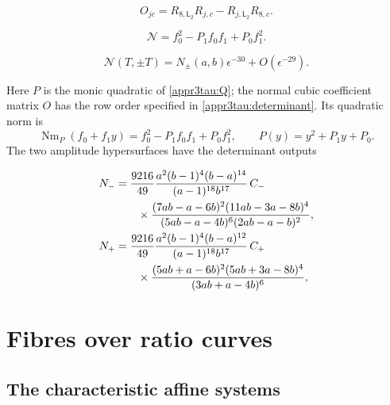 \begin{equation}\label{supp:appr3tau:determinant}
 O_{jc}=R_{8,\mathsf L_2}R_{j,c}
             -R_{j,\mathsf L_2}R_{8,c}.
\end{equation}

\begin{equation}\label{supp:appr3tau:norm}
 \mathcal N=f_0^2-P_1f_0f_1+P_0f_1^2.
\end{equation}

\begin{equation}\label{supp:appr3tau:laurent}
 \mathcal N(T,\pm T)
   =N_\pm(a,b)\epsilon^{-30}+O(\epsilon^{-29}).
\end{equation}

Here $P$ is the monic quadratic of
\eqref{appr3tau:Q}; the normal cubic coefficient matrix $O$
has the row order specified in \eqref{appr3tau:determinant}.
Its quadratic norm is
\[
 \operatorname{Nm}_{P}(f_0+f_1y)
       =f_0^2-P_1f_0f_1+P_0f_1^2,
 \qquad P(y)=y^2+P_1y+P_0.
\]
The two amplitude hypersurfaces have the determinant outputs

\begin{align}
 N_-&=\frac{9216}{49}
 \frac{a^2(b-1)^4(b-a)^{14}}
      {(a-1)^{18}b^{17}}\,C_-\notag\\
 &\qquad\times
 \frac{(7ab-a-6b)^2(11ab-3a-8b)^4}
      {(5ab-a-4b)^6(2ab-a-b)^2},
 \label{supp:appr3tau:negative}\\
 N_+&=\frac{9216}{49}
 \frac{a^2(b-1)^4(b-a)^{12}}
      {(a-1)^{18}b^{17}}\,C_+\notag\\
 &\qquad\times
 \frac{(5ab+a-6b)^2(5ab+3a-8b)^4}
      {(3ab+a-4b)^6},
 \label{supp:appr3tau:positive}
\end{align}

\clearpage
\section{Fibres over ratio curves}\label{supp:curves}

\subsection{The characteristic affine systems}

